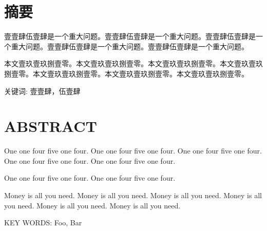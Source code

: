\chapter*{\bfseries 摘要}

壹壹肆伍壹肆是一个重大问题。壹壹肆伍壹肆是一个重大问题。壹壹肆伍壹肆是一个重大问题。壹壹肆伍壹肆是一个重大问题。壹壹肆伍壹肆是一个重大问题。

本文壹玖壹玖捌壹零。本文壹玖壹玖捌壹零。本文壹玖壹玖捌壹零。本文壹玖壹玖捌壹零。本文壹玖壹玖捌壹零。本文壹玖壹玖捌壹零。本文壹玖壹玖捌壹零。

\bigskip
\bigskip

关键词: 壹壹肆，伍壹肆

\chapter*{\bfseries ABSTRACT}


One one four five one four. One one four five one four. One one four five one four. One one four five one four. One one four five one four.

One one four five one four. One one four five one four.

Money is all you need. Money is all you need. Money is all you need. Money is all you need. Money is all you need. Money is all you need.

\bigskip
\bigskip

KEY WORDS: Foo, Bar
